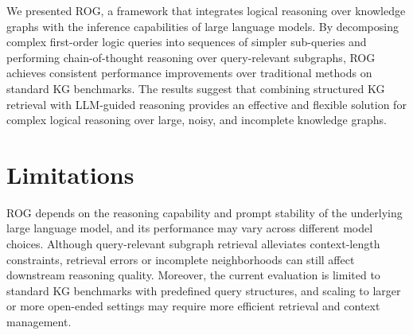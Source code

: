 \documentclass[11pt]{article}
\begin{document}
We presented ROG, a framework that integrates logical reasoning over knowledge graphs with the inference capabilities of large language models.
By decomposing complex first-order logic queries into sequences of simpler sub-queries and performing chain-of-thought reasoning over query-relevant subgraphs, ROG achieves consistent performance improvements over traditional methods on standard KG benchmarks.
The results suggest that combining structured KG retrieval with LLM-guided reasoning provides an effective and flexible solution for complex logical reasoning over large, noisy, and incomplete knowledge graphs.



\section*{Limitations}

ROG depends on the reasoning capability and prompt stability of the underlying large language model, and its performance may vary across different model choices.
Although query-relevant subgraph retrieval alleviates context-length constraints, retrieval errors or incomplete neighborhoods can still affect downstream reasoning quality.
Moreover, the current evaluation is limited to standard KG benchmarks with predefined query structures, and scaling to larger or more open-ended settings may require more efficient retrieval and context management.






\end{document}
